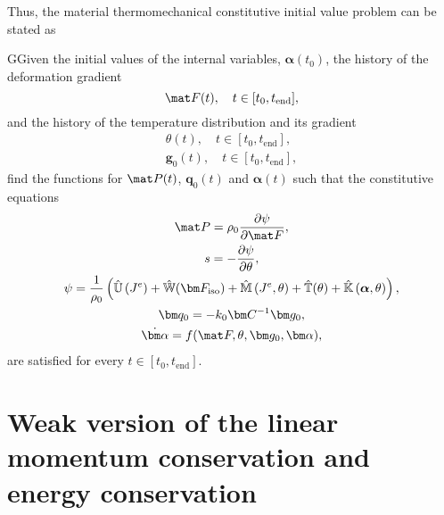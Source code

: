 Thus, the material thermomechanical constitutive initial value problem can be stated as
    \begin{problem}
    GGiven the initial values of the internal variables, $\bm \alpha(t_0)$, the history of the deformation gradient
    \begin{equation}
        \mat F(t),\quad t\in[t_0,t_\text{end}],
    \end{equation}
    and the history of the temperature distribution and its gradient
    \begin{gather}
    \theta(t),\quad t\in[t_0,t_\text{end}],\\
    \bm g_0(t), \quad t\in[t_0, t_\text{end}],
    \end{gather}
    find the functions for $\mat P(t)$, \(\bm q_0(t)\) and $\bm \alpha(t)$ such that the constitutive equations
    \begin{gather}
        \mat P = \rho_0 \frac{\partial \psi}{\partial \mat F},\\
        s = -\frac{\partial \psi}{\partial \theta},\\
        \psi =\frac{1}{\rho_0}\left( \hat{\mathbb{U}}\left(J^{e}\right)+\hat{\mathbb{W}}(\bm F_\text{iso})+\hat{\mathbb{M}}\left(J^{e}, \theta\right)+\hat{\mathbb{T}}(\theta)+\hat{\mathbb{K}}\left(\boldsymbol{\alpha}, \theta\right)\right),\\
        \bm q_0 = - k_0 \bm C^{-1} \bm g_0,\\
        \dot{\bm \alpha} = f(\mat F, \theta, \bm g_0 ,\bm \alpha),
    \end{gather}
    are satisfied for every $t\in [t_0, t_\text{end}]$.
    \end{problem}

\section{Weak version of the linear momentum conservation and energy conservation}

